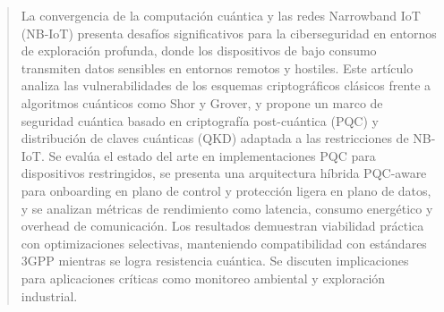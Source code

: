 \begin{abstract}
La convergencia de la computación cuántica y las redes Narrowband IoT (NB-IoT) presenta desafíos significativos para la ciberseguridad en entornos de exploración profunda, donde los dispositivos de bajo consumo transmiten datos sensibles en entornos remotos y hostiles. Este artículo analiza las vulnerabilidades de los esquemas criptográficos clásicos frente a algoritmos cuánticos como Shor y Grover, y propone un marco de seguridad cuántica basado en criptografía post-cuántica (PQC) y distribución de claves cuánticas (QKD) adaptada a las restricciones de NB-IoT. Se evalúa el estado del arte en implementaciones PQC para dispositivos restringidos, se presenta una arquitectura híbrida PQC-aware para onboarding en plano de control y protección ligera en plano de datos, y se analizan métricas de rendimiento como latencia, consumo energético y overhead de comunicación. Los resultados demuestran viabilidad práctica con optimizaciones selectivas, manteniendo compatibilidad con estándares 3GPP mientras se logra resistencia cuántica. Se discuten implicaciones para aplicaciones críticas como monitoreo ambiental y exploración industrial.
\end{abstract}
